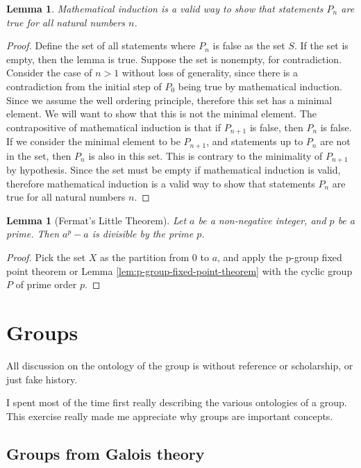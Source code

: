 \documentclass{tufte-book}
\newtheorem{lemma}[theorem]{Lemma}
\begin{document}
\begin{lemma}
  Mathematical induction is a valid way to show that statements $P_n$ are true for all natural numbers $n$.
\end{lemma}

\begin{proof}
  Define the set of all statements where $P_n$ is false as the set $S$. If the set is empty, then the lemma is true.
  Suppose the set is nonempty, for contradiction.
  Consider the case of $n > 1$ without loss of generality, since there is a contradiction from the initial step of $P_0$ being true 
  by mathematical induction.
  Since we assume the well ordering principle, therefore this set has a minimal element.
  We will want to show that this is not the minimal element.
  The contrapositive of mathematical induction is that if $P_{n+1}$ is false, then $P_{n}$ is false.
  If we consider the minimal element to be $P_{n+1}$, and statements up to $P_{n}$ are not in the set, then $P_{n}$ is also in this set.
  This is contrary to the minimality of $P_{n+1}$ by hypothesis.
  Since the set must be empty if mathematical induction is valid, therefore mathematical induction is a valid way to show that statements $P_n$ are true for all natural numbers $n$.
\end{proof}

\begin{lemma}[Fermat's Little Theorem]
  Let $a$ be a non-negative integer, and $p$ be a prime.
  Then $a^p - a$ is divisible by the prime $p$. 
\end{lemma}

\begin{proof}
  Pick the set $X$ as the partition from $0$ to $a$, and apply the p-group fixed point theorem or Lemma \ref{lem:p-group-fixed-point-theorem} with the cyclic group $P$ of prime order $p$.
\end{proof}

\chapter{Groups}
\label{ch:group}

All discussion on the ontology of the group is without reference or scholarship, or just fake history.

I spent most of the time first really describing the various ontologies of a group. This exercise really made me appreciate why groups are important concepts.

\section{Groups from Galois theory}\label{sec:groupsgalois}
\end{document}

